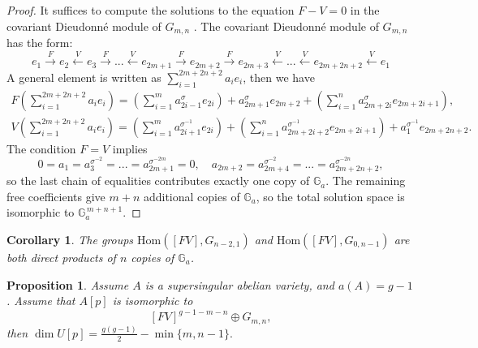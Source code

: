 \documentclass[a4paper,12pt,twoside]{report}
\newtheorem{proposition}[theorem]{Proposition}
\newtheorem{corollary}[theorem]{Corollary}
\newcommand{\G}{\mathbb{G}}
\newcommand{\Hom}{\mathrm{Hom}}
\begin{document}
\begin{proof}
    It suffices to compute the solutions to the equation $F-V=0$ in the covariant Dieudonné module of $G_{m,n}$ . 
    The covariant Dieudonné module of $G_{m,n}$ has the form: 
    \[e_1\xrightarrow{F}e_2\xleftarrow{V}e_3\xrightarrow{F}...\xleftarrow{V}e_{2m+1}\xrightarrow{F}e_{2m+2}\xrightarrow{F}e_{2m+3}\xleftarrow{V}...\xleftarrow{V}e_{2m+2n+2}\xleftarrow{V}e_1\]  
    A general element is written as \(\sum_{i=1}^{2m+2n+2}a_ie_i\), then we have \[\begin{aligned}
        F(\sum_{i=1}^{2m+2n+2}a_ie_i)=(\sum_{i=1}^{m}a_{2i-1}^\sigma e_{2i})+a_{2m+1}^\sigma e_{2m+2}+(\sum_{i=1}^n a_{2m+2i}^\sigma e_{2m+2i+1}),\\
        V(\sum_{i=1}^{2m+2n+2}a_ie_i)=(\sum_{i=1}^{m}a_{2i+1}^{\sigma^{-1}} e_{2i})+(\sum_{i=1}^n a_{2m+2i+2}^{\sigma^{-1}} e_{2m+2i+1})+a_{1}^{\sigma^{-1}} e_{2m+2n+2}.
    \end{aligned}\]
    The condition $F=V$ implies 
    \[0=a_1=a_3^{\sigma^{-2}}=...=a_{2m+1}^{\sigma^{-2m}}=0,\quad a_{2m+2}=a_{2m+4}^{\sigma^{-2}}=...=a_{2m+2n+2}^{\sigma^{-2n}},\]
    so the last chain of equalities contributes exactly one copy of $\G_a$.  
    The remaining free coefficients give $m+n$ additional copies of $\G_a$, so the total solution space is isomorphic to $\G_a^{\,m+n+1}$.  
\end{proof}

\begin{corollary}\label{HomFVGn}
The groups $\Hom([FV],G_{n-2,1})$ and $\Hom([FV],G_{0,n-1})$ are both direct products of $n$ copies of $\G_a$. 
\end{corollary}

\begin{proposition}
    Assume $A$ is a supersingular abelian variety, and $a(A)=g-1$. 
    Assume that $A[p]$ is isomorphic to 
    \[[FV]^{g-1-m-n}\oplus G_{m,n},\]
    then $\dim U[p]=\frac{g(g-1)}{2}-\min\{m,n-1\}. $
\end{proposition}
\end{document}
